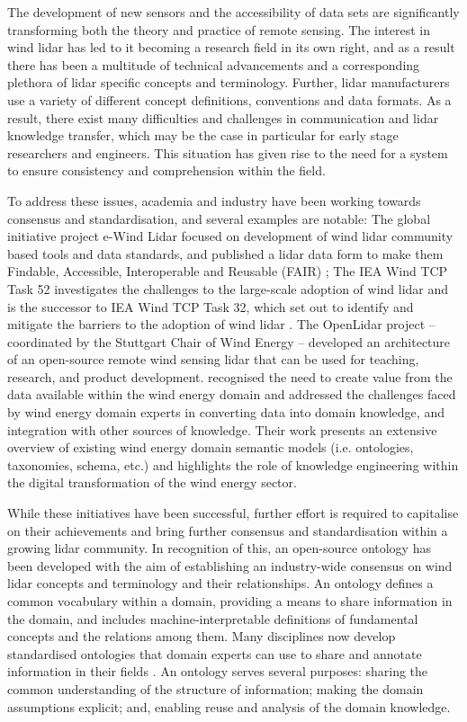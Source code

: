 \documentclass[remotesensing,article,submit,pdftex,moreauthors]{Definitions/mdpi}
\begin{document}
The development of new sensors and the accessibility of data sets are significantly transforming both the theory and practice of remote sensing.
The interest in wind lidar has led to it becoming a research field in its own right, and as a result there has been a multitude of technical advancements and a corresponding plethora of lidar specific concepts and terminology. 
Further, lidar manufacturers use a variety of different concept definitions, conventions and data formats.
As a result, there exist many difficulties and challenges in communication and lidar knowledge transfer, which may be the case in particular for early stage researchers and engineers. This situation has given rise to the need for a system to ensure consistency and comprehension within the field.

To address these issues, academia and industry have been working towards consensus and standardisation, and several examples are notable:
The global initiative project e-Wind Lidar \cite{ref-e-Wind-Lidar} focused on development of wind lidar community based tools and data standards, and published a lidar data form to make them Findable, Accessible, Interoperable and Reusable (FAIR) \cite{ref-FAIR}; The IEA Wind TCP Task 52 \cite{ref-IEA-Wind-Task-52} investigates the challenges to the large-scale adoption of wind lidar and is the successor to IEA Wind TCP Task 32, which set out to identify and mitigate the barriers to the adoption of wind lidar \cite{ref-Clifton-Schlipf}. The OpenLidar project \cite{clifton_andrew_2019_3414197} -- coordinated by the Stuttgart Chair of Wind Energy -- developed an architecture of an open-source remote wind sensing lidar that can be used for teaching, research, and product development.
\citet{Marykovskiy2023} recognised the need to create value from the data available within the wind energy domain and addressed the challenges faced by wind energy domain experts in converting data into domain knowledge, and integration with other sources of knowledge. Their work presents an extensive overview of existing wind energy domain semantic models (i.e. ontologies, taxonomies, schema, etc.) and highlights the role of knowledge engineering within the digital transformation of the wind energy sector.

While these initiatives have been successful, further effort is required to capitalise on their achievements and bring further consensus and standardisation within a growing lidar community.
In recognition of this, an open-source ontology has been developed with the aim of establishing an industry-wide consensus on wind lidar concepts and terminology and their relationships.
An ontology defines a common vocabulary within a domain, providing a means to share information in the domain, and includes machine-interpretable definitions of fundamental concepts and the relations among them.
Many disciplines now develop standardised ontologies that domain experts can use to share and annotate information in their fields \cite{ref-Noy}.
An ontology serves several purposes: sharing the common understanding of the structure of information; making the domain assumptions explicit; and, enabling reuse and analysis of the domain knowledge.
\end{document}
